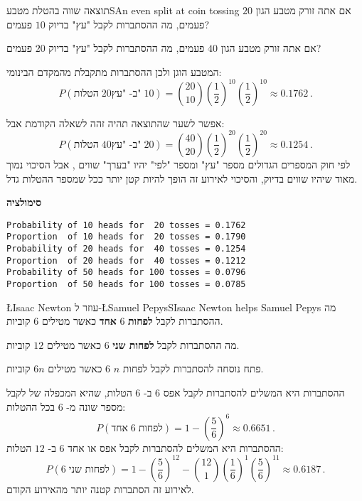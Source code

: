 
\begin{prob}{תוצאה שווה בהטלת מטבע}{S}{An even split at coin tossing}
אם אתה זורק מטבע הגון 
$20$
פעמים, מה ההסתברות לקבל "עץ" בדיוק 
$10$
פעמים?

אם אתה זורק מטבע הגון 
$40$
פעמים, מה ההסתברות לקבל "עץ" בדיוק 
$20$
פעמים?
\end{prob}

\solution{}

המטבע הוגן ולכן ההסתברות מתקבלת מהמקדם הבינומי:
\[
P(\textrm{הטלות}\; 20\textrm{ב- "עץ"}\;10)=
{20 \choose 10} \left(\frac{1}{2}\right)^{10}\left(\frac{1}{2}\right)^{10}\approx 0.1762\,.
\]

אפשר לשער שהתוצאה תהיה זהה לשאלה הקודמת אבל:
\[
P(\textrm{הטלות}\;40\textrm{ב- "עץ"}\;20)=
{40 \choose 20} \left(\frac{1}{2}\right)^{20}\left(\frac{1}{2}\right)^{20}\approx 0.1254\,.
\]
לפי חוק המספרים הגדולים מספר "עץ" ומספר "לפי" יהיו "בערך" שווים
\cite[Section~8.4]{ross},
אבל הסיכוי נמוך מאוד שיהיו שווים בדיוק, והסיכוי לאירוע זה הופך להיות קטן יותר ככל שמספר ההטלות גדל.

\textbf{סימולציה}
\begin{verbatim}
Probability of 10 heads for  20 tosses = 0.1762
Proportion  of 10 heads for  20 tosses = 0.1790
Probability of 20 heads for  40 tosses = 0.1254
Proportion  of 20 heads for  40 tosses = 0.1212
Probability of 50 heads for 100 tosses = 0.0796
Proportion  of 50 heads for 100 tosses = 0.0785
\end{verbatim}


\begin{prob}{\L{\small Isaac Newton} עוזר ל-\L{\small Samuel Pepys}}{S}{Isaac Newton helps Samuel Pepys}
מה ההסתברות לקבל
\textbf{לפחות}
$6$
\textbf{אחד}
כאשר מטילים 
$6$
קוביות.

מה ההסתברות לקבל
\textbf{לפחות שני}
$6$
כאשר מטילים 
$12$
קוביות.

פתח נוסחה להסתברות לקבל לפחות
$n$ $6$
כאשר מטילים 
$6n$
קוביות.
\end{prob}

\solution{}

ההסתברות היא המשלים להסתברות לקבל אפס 
$6$
ב-%
$6$
הטלות, שהיא המכפלה של לקבל מספר שונה מ-%
$6$
בכל ההטלות:
\[
P(\textrm{אחד} \; 6\; \textrm{לפחות})=1-\left(\frac{5}{6}\right)^6\approx 0.6651\,.
\]
ההסתברות היא המשלים להסתברות לקבל אפס או אחד
$6$
ב-%
$12$
הטלות:
\[
P(6\; \textrm{לפחות שני})=1-\left(\frac{5}{6}\right)^{12}-{12\choose 1}\left(\frac{1}{6}\right)^{1}\left(\frac{5}{6}\right)^{11}\approx 0.6187\,.
\]
לאירוע זה הסתברות קטנה יותר מהאירוע הקודם.

